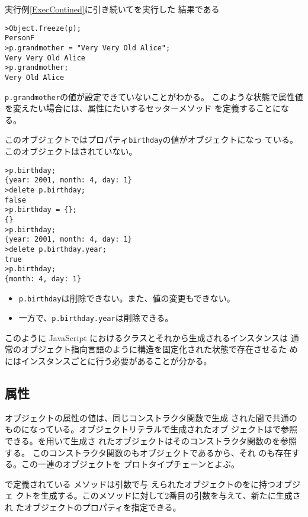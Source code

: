 \begin{Exec}
   実行例\ref{ExecContined}に引き続いてを実行した
   結果である
\begin{Verbatim}
>Object.freeze(p);
PersonF
>p.grandmother = "Very Very Old Alice";
Very Very Old Alice
>p.grandmother;
Very Old Alice
\end{Verbatim}
 \texttt{p.grandmother}の値が設定できていないことがわかる。
このような状態で属性値を変えたい場合には、属性にたいするセッターメソッド
  を定義することになる。

このオブジェクトではプロパティ\texttt{birthday}の値がオブジェクトになっ
ている。このオブジェクトはされていない。
\begin{Verbatim}
>p.birthday;
{year: 2001, month: 4, day: 1}
>delete p.birthday;
false
>p.birthday = {};
{}
>p.birthday;
{year: 2001, month: 4, day: 1}
>delete p.birthday.year;
true
>p.birthday;
{month: 4, day: 1}
\end{Verbatim}
  \begin{itemize}
   \item \texttt{p.birthday}は削除できない。また、値の変更もできない。
   \item 一方で、\texttt{p.birthday.year}は削除できる。
  \end{itemize}
 \end{Exec}
 
 このように JavaScript におけるクラスとそれから生成されるインスタンスは
 通常のオブジェクト指向言語のように構造を固定化された状態で存在させるた
 めにはインスタンスごとに行う必要があることが分かる。
 \subsection{\protect{}属性}
 オブジェクトの属性の値は、同じコンストラクタ関数で生成
 された間で共通のものになっている。オブジェクトリテラルで生成されたオブ
 ジェクトはで参照できる。を用いて生成さ
 れたオブジェクトはそのコンストラクタ関数のを参照する。
 このコンストラクタ関数のもオブジェクトであるから、それ
 のも存在する。この一連のオブジェクトを
 プロトタイプチェーンとよぶ。

 \JS で定義されている  メソッドは引数で与
 えられたオブジェクトのをに持つオブジェ
 クトを生成する。このメソッドに対して2番目の引数を与えて、新たに生成され
 たオブジェクトのプロパティを指定できる。
